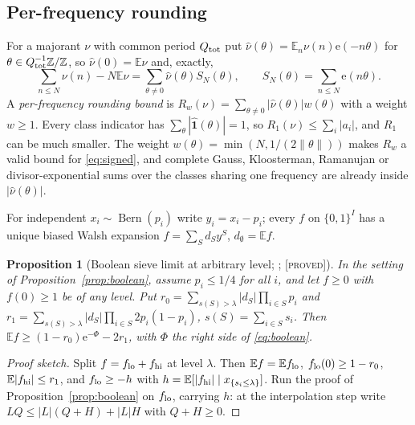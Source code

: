 \documentclass[10pt,reqno]{amsart}
\newtheorem{proposition}[theorem]{Proposition}
\theoremstyle{definition}
\theoremstyle{remark}
\newcommand{\E}{\mathbb E}
\newcommand{\Z}{\mathbb Z}
\newcommand{\ind}{\mathbf 1}
\newcommand{\Bern}{\operatorname{Bern}}
\newcommand{\e}{\mathrm e}
\newcommand{\lab}[1]{\textup{[\textsc{#1}]}}
\begin{document}
\subsection{Per-frequency rounding}
For a majorant $\nu$ with common period $Q_{\rm tot}$ put
$\hat\nu(\theta)=\E_n\nu(n)\e(-n\theta)$ for $\theta\in Q_{\rm tot}^{-1}\Z/\Z$, so
$\hat\nu(0)=\E\nu$ and, exactly,
\begin{equation}\label{eq:signed}
 \sum_{n\leq N}\nu(n)-N\E\nu=\sum_{\theta\neq0}\hat\nu(\theta)S_N(\theta),\qquad
 S_N(\theta)=\sum_{n\leq N}\e(n\theta).
\end{equation}
A \emph{per-frequency rounding bound} is
$R_w(\nu)=\sum_{\theta\neq0}|\hat\nu(\theta)|w(\theta)$ with a weight $w\geq1$.
Every class indicator has $\sum_\theta|\hat{\ind}(\theta)|=1$, so
$R_1(\nu)\leq\sum_i|a_i|$, and $R_1$ can be much smaller.  The weight
$w(\theta)=\min(N,1/(2\|\theta\|))$ makes $R_w$ a valid bound for
\eqref{eq:signed}, and complete Gauss, Kloosterman, Ramanujan or
divisor-exponential sums over the classes sharing one frequency are
already inside $|\hat\nu(\theta)|$.

For independent $x_i\sim\Bern(p_i)$ write $y_i=x_i-p_i$; every $f$ on
$\{0,1\}^I$ has a unique biased Walsh expansion $f=\sum_Sd_Sy^S$, $d_\emptyset=\E f$.

\begin{proposition}[Boolean sieve limit at arbitrary level; {\cite[Prop.~2.1]{NC}}; \lab{proved}]\label{prop:highlevel}
In the setting of Proposition~\ref{prop:boolean}, assume $p_i\leq1/4$ for
all $i$, and let $f\geq0$ with $f(0)\geq1$ be of \emph{any} level.  Put
$r_0=\sum_{s(S)>\lambda}|d_S|\prod_{i\in S}p_i$ and
$r_1=\sum_{s(S)>\lambda}|d_S|\prod_{i\in S}2p_i(1-p_i)$, $s(S)=\sum_{i\in S}s_i$.
Then $\E f\geq(1-r_0)\e^{-\Phi}-2r_1$, with $\Phi$ the right side of
\eqref{eq:boolean}.
\end{proposition}
\begin{proof}[Proof sketch]
Split $f=f_{\rm lo}+f_{\rm hi}$ at level $\lambda$.  Then $\E f=\E f_{\rm lo}$,
$f_{\rm lo}(0)\geq1-r_0$, $\E|f_{\rm hi}|\leq r_1$, and $f_{\rm lo}\geq-h$ with
$h=\E[|f_{\rm hi}|\mid x_{\{s_i\leq\lambda\}}]$.  Run the proof of
Proposition~\ref{prop:boolean} on $f_{\rm lo}$, carrying $h$: at the
interpolation step write $LQ\leq|L|(Q+H)+|L|H$ with $Q+H\geq0$.
\end{proof}
\end{document}
